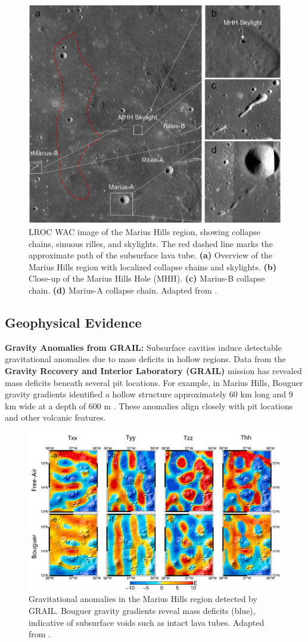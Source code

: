 \begin{figure}[H]
    \centering
    \includegraphics[width=0.5\linewidth]{marius_hills_collapse.png}
    \caption{LROC WAC image of the Marius Hills region, showing collapse chains, sinuous rilles, and skylights. The red dashed line marks the approximate path of the subsurface lava tube. 
    \textbf{(a)} Overview of the Marius Hills region with localized collapse chains and skylights. 
    \textbf{(b)} Close-up of the Marius Hills Hole (MHH). 
    \textbf{(c)} Marius-B collapse chain. 
    \textbf{(d)} Marius-A collapse chain. 
    Adapted from \citet{grails-gradients-mariushills}.}
    \label{fig:marius-hills-collapse}
\end{figure}

\subsection{Geophysical Evidence}

\textbf{Gravity Anomalies from GRAIL:} Subsurface cavities induce detectable gravitational anomalies due to mass deficits in hollow regions. Data from the \textbf{Gravity Recovery and Interior Laboratory (GRAIL)} mission has revealed mass deficits beneath several pit locations. For example, in Marius Hills, Bouguer gravity gradients identified a hollow structure approximately 60 km long and 9 km wide at a depth of 600 m \citep{grails-gradients-mariushills}. These anomalies align closely with pit locations and other volcanic features.

\begin{figure}[H]
    \centering
    \includegraphics[width=0.85\linewidth]{grail-images-grabity.png}
    \caption{Gravitational anomalies in the Marius Hills region detected by GRAIL. Bouguer gravity gradients reveal mass deficits (blue), indicative of subsurface voids such as intact lava tubes. Adapted from \citet{grails-gradients-mariushills}.}
    \label{fig:marius-hills-gravity}
\end{figure}

